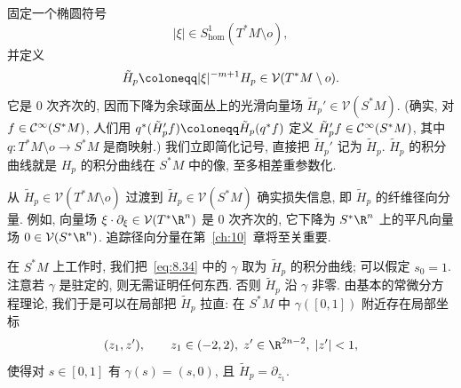 固定一个椭圆符号
\begin{equation}\label{eq:8.36}
    | \xi | \in S^1_{\mathrm{hom}}(T^*M \setminus o),
\end{equation}
并定义
\begin{equation}\label{eq:8.37}
    \tilde{H}_p \defeq | \xi |^{-m+1} H_p \in \mathcal{V}(T^*M \setminus o).
\end{equation}
它是 $0$ 次齐次的, 因而下降为余球面丛上的光滑向量场 $\tilde{H}_p' \in \mathcal{V}(S^*M)$. (确实, 对 $f \in \mathcal{C}^\infty(S^*M)$, 人们用 $q^*(\tilde{H}_p' f) \defeq \tilde{H}_p(q^* f)$ 定义 $\tilde{H}_p' f \in \mathcal{C}^\infty(S^*M)$, 其中 $q \colon T^*M \setminus o \to S^*M$ 是商映射.) 我们立即简化记号, 直接把 $\tilde{H}_p'$ 记为 $\tilde{H}_p$. $\tilde{H}_p$ 的积分曲线就是 $H_p$ 的积分曲线在 $S^*M$ 中的像, 至多相差重参数化.

\begin{remark}\label{rem:8.15}
从 $\tilde{H}_p \in \mathcal{V}(T^*M \setminus o)$ 过渡到 $\tilde{H}_p \in \mathcal{V}(S^*M)$ 确实损失信息, 即 $\tilde{H}_p$ 的纤维径向分量. 例如, 向量场 $\xi \cdot \partial_\xi \in \mathcal{V}(T^*\R^n)$ 是 $0$ 次齐次的, 它下降为 $S^*\R^n$ 上的平凡向量场 $0 \in \mathcal{V}(S^*\R^n)$. 追踪径向分量在第~\ref{ch:10}~章将至关重要.
\end{remark}

在 $S^*M$ 上工作时, 我们把~\eqref{eq:8.34} 中的 $\gamma$ 取为 $\tilde{H}_p$ 的积分曲线; 可以假定 $s_0 = 1$. 注意若 $\gamma$ 是驻定的, 则无需证明任何东西. 否则 $\tilde{H}_p$ 沿 $\gamma$ 非零. 由基本的常微分方程理论, 我们于是可以在局部把 $\tilde{H}_p$ 拉直: 在 $S^*M$ 中 $\gamma([0, 1])$ 附近存在局部坐标
\begin{equation}\label{eq:8.38}
    (z_1, z'), \qquad z_1 \in (-2, 2), \; z' \in \R^{2n-2}, \; | z' | < 1,
\end{equation}
使得对 $s \in [0, 1]$ 有 $\gamma(s) = (s, 0)$, 且 $\tilde{H}_p = \partial_{z_1}$.

